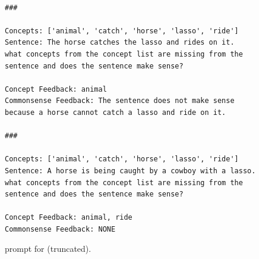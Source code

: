 \begin{figure}

\begin{small}
    \captionsetup{justification=centering, labelfont=bf, font=small}
    \begin{verbatim}

###

Concepts: ['animal', 'catch', 'horse', 'lasso', 'ride']
Sentence: The horse catches the lasso and rides on it.
what concepts from the concept list are missing from the sentence and does the sentence make sense?

Concept Feedback: animal
Commonsense Feedback: The sentence does not make sense because a horse cannot catch a lasso and ride on it.

###

Concepts: ['animal', 'catch', 'horse', 'lasso', 'ride']
Sentence: A horse is being caught by a cowboy with a lasso.
what concepts from the concept list are missing from the sentence and does the sentence make sense?

Concept Feedback: animal, ride
Commonsense Feedback: NONE

\end{verbatim}

\end{small}
\caption{\fbmod prompt for \commongen (truncated).}
    \label{fig:prompt:commongen:fb}
\end{figure}